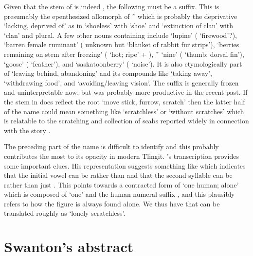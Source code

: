 Given that the stem of  is indeed , the following  must be a suffix.
This is presumably the epenthesized allomorph of  \~\  which is probably the deprivative ‘lacking, deprived of’ as in  ‘shoeless’ with  ‘shoe’ and  ‘extinction of clan’ with  ‘clan’ and  plural.
A few other nouns containing  include  ‘lupine’ ( ‘firewood’?),  ‘barren female ruminant’ ( unknown but  ‘blanket of rabbit fur strips’),  ‘berries remaining on stem after freezing’ ( ‘hot; ripe’ + ),  \~\  ‘nine’ ( ‘thumb; dorsal fin’),  ‘goose’ ( ‘feather’), and  ‘saskatoonberry’ ( ‘noise’).
It is also etymologically part of  ‘leaving behind, abandoning’ and its compounds like  ‘taking away’,  ‘withdrawing food’, and  ‘avoiding/leaving vision’.
The suffix  is generally frozen and uninterpretable now, but was probably more productive in the recent past.
If the stem  in  does reflect the root  ‘move stick, furrow, scratch’ then the latter half of the name  could mean something like ‘scratchless’ or ‘without scratches’ which is relatable to the scratching and collection of scabs reported widely in connection with the story \parencites[821]{de-laguna:1972}[572]{mcclellan:1975b}.

The preceding part of the name  is difficult to identify and this probably contributes the most to its opacity in modern Tlingit.
\citeauthor{swanton:1909}’s transcription  provides some important clues.
His representation suggests something like  which indicates that the initial vowel can be  rather than  and that the second syllable can be  rather than just .
This points towards a contracted form of  ‘one human; alone’ which is composed of  ‘one’ and the human numeral suffix , and this plausibly refers to how the figure is always found alone.
We thus have  that can be translated roughly as ‘lonely scratchless’.

\section{Swanton’s abstract}\label{sec:94-swanton-abstract}


